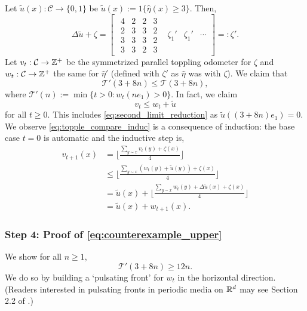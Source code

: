 \documentclass[12pt]{amsart}
\begin{document}
Let $\tilde{u}(x): \mathcal{C} \to \{0 ,1\}$ be  $\tilde{u}(x) := 1 \{ \hat{\eta}(x) \geq 3\}$.
Then, 
\[
\Delta \tilde{u} + \zeta
=
\begin{bmatrix}
\begin{matrix}
4 & 2 & 2 & 3 \\
2 & 3 & 3 & 2 \\
3 & 3 & 3 & 2 \\
3 & 3 & 2 & 3 
\end{matrix}
& \zeta_1' & \zeta_1' & \cdots 
\end{bmatrix}
=: \zeta'.
\]
Let $v_t: \mathcal{C} \to \mathbb{Z}^+$ be the symmetrized parallel toppling odometer for $\zeta$ and $w_t:\mathcal{C} \to \mathbb{Z}^+$ the
same for $\hat{\eta}'$ (defined with $\zeta'$ as $\hat{\eta}$ was with $\zeta$). We claim that 
\begin{equation} \label{eq:second_limit_reduction}
\mathcal{T}'(3 + 8n) \leq \mathcal{T}(3 + 8 n), 
\end{equation}
where $\mathcal{T}'(n) := \min\{t > 0 : w_t(n e_1) > 0\}$.
In fact, we claim
\begin{equation} \label{eq:topple_compare_induc}
v_t \leq w_t + \tilde{u}
\end{equation}
for all $t \geq 0$.  This includes \eqref{eq:second_limit_reduction} as $\tilde{u}( (3 + 8 n) e_1) = 0$. 
We observe \eqref{eq:topple_compare_induc} is a consequence of induction: the base case $t = 0$ is automatic and 
the inductive step is, 
\begin{align*}
v_{t+1}(x) &=  \lfloor \frac{\sum_{y \sim x}  v_t(y) + \zeta(x)}{4} \rfloor  \\
&\leq  \lfloor \frac{\sum_{y \sim x}  (w_t(y) + \tilde{u}(y)) + \zeta(x)}{4} \rfloor  \\
&= \tilde{u}(x) +  \lfloor \frac{\sum_{y \sim x}  w_t(y) + \Delta \tilde{u}(x) + \zeta(x)}{4} \rfloor  \\
&= \tilde{u}(x) +  w_{t+1}(x).
\end{align*}

\subsubsection*{Step 4: Proof of \eqref{eq:counterexample_upper}}
We show for all $n \geq 1$,
\begin{equation} \label{eq:second_limit_upper_bound}
\mathcal{T}'(3 + 8 n) \geq 12 n.
\end{equation}
We do so by building a `pulsating front' for $w_t$ in the horizontal direction. (Readers interested in pulsating fronts in periodic media on $\mathbb{R}^d$ may see Section 2.2 of \cite{xin2009introduction}.)
\end{document}
